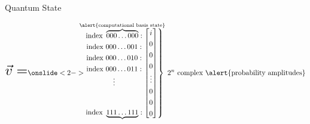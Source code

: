 \begin{frame}{Quantum State}


\[ \scalebox{2}{$ \vec v  = $} %
	\def\arraystretch{1.3}
    \onslide<2->{
    \begin{matrix*}[c]
    \text{index }\overbrace{000\dots000}^{\mathclap{\text{\alert{computational basis state}}}}:\\\text{index }{000\dots001}:\\\text{index }{000\dots010}:\\\text{index }{000\dots011}:\\\vdots\vspace{1em}\\\\\text{index }\underbrace{111\dots111}_{\vspace{3em}}:\\
    \end{matrix*}
    }
    \left.
    \begin{bmatrix*}[c]
     i \\0 \\ 0\\ 0 \\ \vdots \\ 0 \\ 0\\ 0  \\
    \end{bmatrix*}
    \right\}\text{ $2^n$ complex \alert{probability amplitudes}}
\]



\end{frame}



